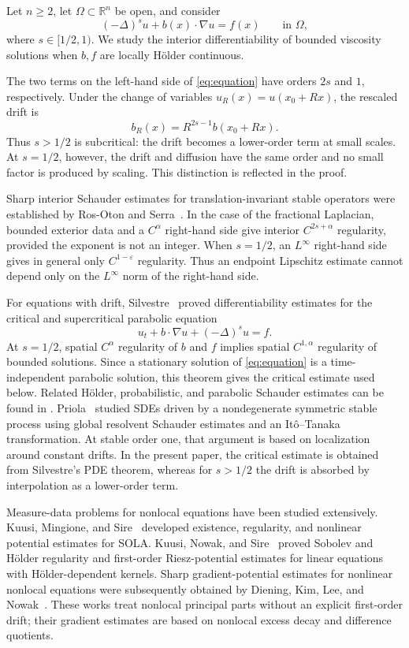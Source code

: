 \documentclass[reqno]{amsart}
\numberwithin{equation}{section}
\theoremstyle{plain}
\theoremstyle{definition}
\theoremstyle{remark}
\newcommand{\R}{\mathbb R}
\begin{document}
Let $n\ge2$, let $\Omega\subset\R^n$ be open, and consider
\begin{equation}\label{eq:equation}
 (-\Delta)^s u+b(x)\cdot\nabla u=f(x)
 \qquad\text{in }\Omega,
\end{equation}
where $s\in[1/2,1)$.  We study the interior differentiability of bounded
viscosity solutions when $b,f$ are locally H\"older continuous.

The two terms on the left-hand side of \eqref{eq:equation} have orders
$2s$ and $1$, respectively.  Under the change of variables
$u_R(x)=u(x_0+Rx)$, the rescaled drift is
\[
 b_R(x)=R^{2s-1}b(x_0+Rx).
\]
Thus $s>1/2$ is subcritical: the drift becomes a lower-order term at small
scales.
At $s=1/2$, however, the drift and diffusion have the same order and no
small factor is produced by scaling.  This distinction is reflected in the
proof.

Sharp interior Schauder estimates for translation-invariant stable operators
were established by Ros-Oton and Serra~\cite{RosOtonSerra2016}.  In the case
of the fractional Laplacian, bounded exterior data and a $C^\alpha$
right-hand side give interior $C^{2s+\alpha}$ regularity, provided the exponent
is not an integer.  When $s=1/2$, an $L^\infty$ right-hand side gives in
general only $C^{1-\varepsilon}$ regularity.  Thus an endpoint Lipschitz
estimate cannot depend only on the $L^\infty$ norm of the right-hand side.

For equations with drift, Silvestre~\cite{Silvestre2012Diff} proved
differentiability estimates for the critical and supercritical parabolic
equation
\[
 u_t+b\cdot\nabla u+(-\Delta)^s u=f.
\]
At $s=1/2$, spatial $C^\alpha$ regularity of $b$ and $f$ implies spatial
$C^{1,\alpha}$ regularity of bounded solutions.  Since a stationary solution
of \eqref{eq:equation} is a time-independent parabolic solution, this theorem
gives the critical estimate used below.  Related H\"older, probabilistic, and
parabolic Schauder estimates can be found in
\cite{Silvestre2012Holder,Priola2012,Chaudru2020}.  Priola~\cite{Priola2012}
studied SDEs driven by a nondegenerate symmetric stable process using global
resolvent Schauder estimates and an It\^o--Tanaka transformation.  At stable
order one, that argument is based on localization around constant drifts.  In
the present paper, the critical estimate is obtained from Silvestre's PDE
theorem, whereas for $s>1/2$ the drift is absorbed by interpolation as a
lower-order term.

Measure-data problems for nonlocal equations have been studied extensively.
Kuusi, Mingione, and Sire~\cite{KuusiMingioneSire2015} developed existence,
regularity, and nonlinear potential estimates for SOLA.  Kuusi, Nowak, and
Sire~\cite{KuusiNowakSire2022} proved Sobolev and H\"older regularity and
first-order Riesz-potential estimates for linear equations with
H\"older-dependent kernels.  Sharp gradient-potential estimates for nonlinear
nonlocal equations were subsequently obtained by Diening, Kim, Lee, and
Nowak~\cite{DieningKimLeeNowak2025}.  These works treat nonlocal principal
parts without an explicit first-order drift; their gradient estimates are
based on nonlocal excess decay and difference quotients.
\end{document}
